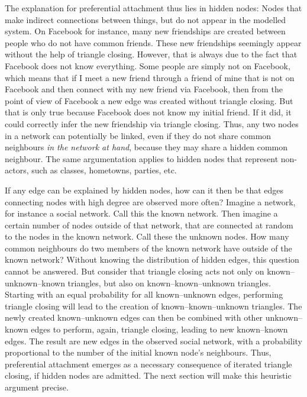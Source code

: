 \documentclass{jimis}
\begin{document}
The explanation for preferential attachment thus lies in hidden nodes:
Nodes that make indirect connections between things, but do not appear
in the modelled system.  On Facebook for instance, many new
friendships are created between people who do not have common friends.
These new friendships seemingly appear without the help of triangle
closing.  However, that is always due to the fact that Facebook does not know
everything.  Some people are simply not on Facebook, which means that if
I meet a new friend through a friend of mine that is not on Facebook and
then connect with my new friend via Facebook, then from the point of
view of Facebook a new edge was created without triangle
closing.
But
that is only true because Facebook does not know my initial friend.  If
it did, it could correctly infer the new friendship via triangle
closing.  Thus, any two nodes in a network can potentially be linked,
even if they do not share common neighbours \emph{in the network at
  hand}, because they may share a hidden common neighbour.  
The same argumentation applies to hidden nodes that represent
non-actors, such as classes, hometowns, parties, etc. 

If any edge can be explained by hidden nodes, how can it then be that
edges connecting nodes with high degree are observed more often? 
Imagine a network, for instance a social
network.  Call this the known network.  Then imagine a certain number of
nodes outside of that 
network, that are connected at random to the nodes in the known
network.  Call these the unknown nodes.   How many common neighbours do
two members of the known network 
have outside of the known network?  Without knowing the distribution of
hidden edges, this question cannot be answered.  But consider that
triangle closing acts not only on known--unknown--known triangles, but
also on known--known--unknown triangles.  Starting with an equal
probability for all known--unknown edges, performing triangle closing
will lead to the creation of known--known--unknown triangles.  The newly
created known--unknown edges can then be combined with other
unknown--known edges to perform, again, triangle closing, leading to new 
known--known edges.  The result are new edges in the observed social
network, with a probability proportional to the number of the initial
known node's neighbours.  
Thus, preferential attachment emerges as a necessary consequence of
iterated triangle closing, if hidden nodes are admitted.
The next section will make this heuristic argument precise. 
\end{document}
